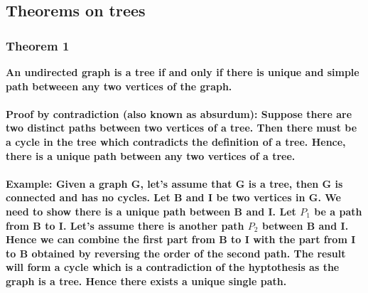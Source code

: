 \documentclass{article}
\begin{document}
\subsection{Theorems on trees}

\subsubsection{Theorem 1}

\textbf{An undirected graph is a tree if and only if there is unique and simple path betweeen any two vertices of the graph.}

\paragraph{Proof by contradiction (also known as absurdum): Suppose there are two distinct paths between two vertices of a tree. Then there must be a cycle in the tree which contradicts the definition of a tree. Hence, there is a unique path between any two vertices of a tree.}

\begin{center}
\end{center}

\paragraph{Example: Given a graph G, let's assume that G is a tree, then G is connected and has no cycles. Let B and I be two vertices in G. We need to show there is a unique path between B and I. Let \(P_1\) be a path from B to I. Let's assume there is another path \(P_2\) between B and I. Hence we can combine the first part from B to I with the part from I to B obtained by reversing the order of the second path. The result will form a cycle which is a contradiction of the hyptothesis as the graph is a tree. Hence there exists a unique single path. }
\end{document}
